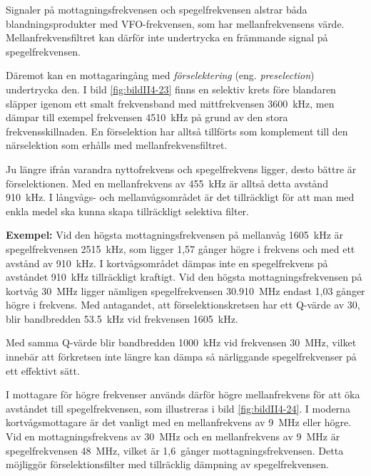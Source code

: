 Signaler på mottagningsfrekvensen och spegelfrekvensen alstrar båda
blandningsprodukter med VFO-frekvensen, som har mellanfrekvensens värde.
Mellanfrekvensfiltret kan därför inte undertrycka en främmande signal på
spegelfrekvensen.


Däremot kan en mottagaringång med \emph{förselektering} (eng.
\emph{preselection}) undertrycka den.
I bild \ref{fig:bildII4-23} finns en selektiv krets före blandaren släpper
igenom ett smalt frekvensband med mittfrekvensen \SI{3600}{\kilo\hertz}, men
dämpar till exempel frekvensen \SI{4510}{\kilo\hertz} på grund av den stora
frekvensskillnaden.
En förselektion har alltså tillförts som komplement till den närselektion som
erhålls med mellanfrekvensfiltret.


Ju längre ifrån varandra nyttofrekvens och spegelfrekvens ligger, desto bättre
är förselektionen.
Med en mellanfrekvens av \SI{455}{\kilo\hertz} är alltså detta avstånd
\SI{910}{\kilo\hertz}.
I långvågs- och mellanvågsområdet är det tillräckligt för att man med enkla
medel ska kunna skapa tillräckligt selektiva filter.

\textbf{Exempel:}
Vid den högsta mottagningsfrekvensen på mellanvåg \SI{1605}{\kilo\hertz} är
spegelfrekvensen \SI{2515}{\kilo\hertz}, som ligger 1,57 gånger högre i frekvens
och med ett avstånd av \SI{910}{\kilo\hertz}.
I kortvågsområdet dämpas inte en spegelfrekvens på avståndet
\SI{910}{\kilo\hertz} tillräckligt kraftigt.
Vid den högsta mottagningsfrekvensen på kortvåg \SI{30}{\mega\hertz} ligger
nämligen spegelfrekvensen \SI{30,910}{\mega\hertz} endast 1,03 gånger högre i
frekvens.
Med antagandet, att förselektionskretsen har ett Q-värde av 30, blir
bandbredden \SI{53,5}{\kilo\hertz} vid frekvensen \SI{1605}{\kilo\hertz}.

Med samma Q-värde blir bandbredden \SI{1000}{\kilo\hertz} vid frekvensen
\SI{30}{\mega\hertz}, vilket innebär att förkretsen inte längre kan dämpa så
närliggande spegelfrekvenser på ett effektivt sätt.

I mottagare för högre frekvenser används därför högre mellanfrekvens
för att öka avståndet till spegelfrekvensen, som illustreras i bild
\ref{fig:bildII4-24}.
I moderna kortvågsmottagare är det vanligt med en mellanfrekvens av
\SI{9}{\mega\hertz} eller högre.
Vid en mottagningsfrekvens av \SI{30}{\mega\hertz} och en mellanfrekvens av
\SI{9}{\mega\hertz} är spegelfrekvensen \SI{48}{\mega\hertz}, vilket är
1,6~gånger mottagningsfrekvensen.
Detta möjliggör förselektionsfilter med tillräcklig dämpning av
spegelfrekvensen.


